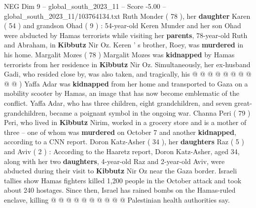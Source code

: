 \begin{textsample}{NEG Dim 9 – global\_south\_2023\_11 – Score -5.00 – global\_south\_2023\_11/103764134.txt}
Ruth Monder ( 78 ), her \textbf{daughter} Karen ( 54 ) and grandson Ohad ( 9 ) : 54-year-old Keren Munder and her son Ohad were abducted by Hamas terrorists while visiting her \textbf{parents}, 78-year-old Ruth and Abraham, in \textbf{Kibbutz} Nir Oz.
Keren ' s brother, Roey, was \textbf{murdered} in his home.
Margalit Mozes ( 78 ) Margalit Mozes was \textbf{kidnapped} by Hamas terrorists from her residence in \textbf{Kibbutz} Nir Oz.
Simultaneously, her ex-husband Gadi, who resided close by, was also taken, and tragically, his @ @ @ @ @ @ @ @ @ @ ) Yaffa Adar was \textbf{kidnapped} from her home and transported to Gaza on a mobility scooter by Hamas, an image that has now become emblematic of the conflict.
Yaffa Adar, who has three children, eight grandchildren, and seven great-grandchildren, became a poignant symbol in the ongoing war.
Channa Peri ( 79 ) Peri, who lived in \textbf{Kibbutz} Nirim, worked in a grocery store and is a mother of three -- one of whom was \textbf{murdered} on October 7 and another \textbf{kidnapped}, according to a CNN report.
Doron Katz-Asher ( 34 ), her \textbf{daughters} Raz ( 5 ) and Aviv ( 2 ) : According to the Haaretz report, Doron Katz-Asher, aged 34, along with her two \textbf{daughters}, 4-year-old Raz and 2-year-old Aviv, were abducted during their visit to \textbf{Kibbutz} Nir Oz near the Gaza border.
Israeli tallies show Hamas fighters killed 1,200 people in the October attack and took about 240 hostages.
Since then, Israel has rained bombs on the Hamas-ruled enclave, killing @ @ @ @ @ @ @ @ @ @ Palestinian health authorities say.

\end{textsample}
